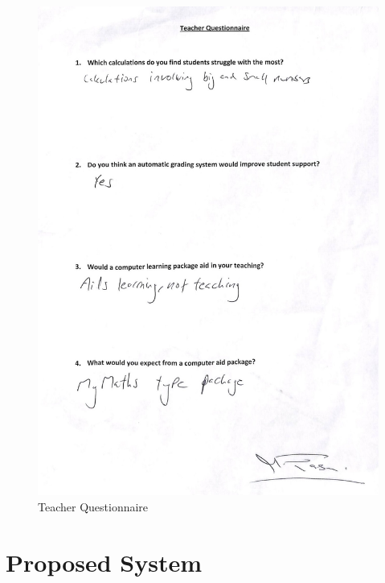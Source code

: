 \documentclass[a4paper,12pt]{report}
\begin{document}
\begin{figure}
\centering
\includegraphics{TeacherQuestionnaire}
\caption{Teacher Questionnaire}
\label{fig:tQuestionnaire}
\end{figure}





\section{Proposed System}        
\end{document}
